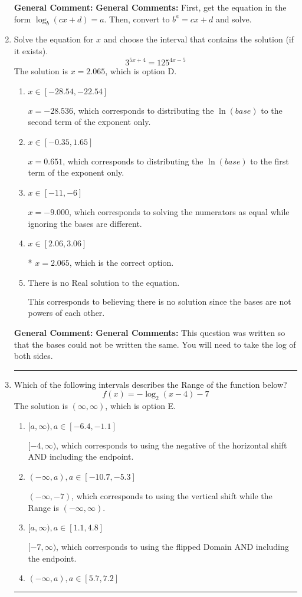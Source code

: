 \documentclass{extbook}[14pt]
\newcommand{\litem}[1]{\item #1

\rule{\textwidth}{0.4pt}}
\begin{document}
\begin{enumerate}
{\textbf{General Comment:} \textbf{General Comments:} First, get the equation in the form $\log_b{(cx+d)} = a$. Then, convert to $b^a = cx+d$ and solve.
}
\litem{
Solve the equation for $x$ and choose the interval that contains the solution (if it exists).
\[ 3^{5x+4} = 125^{4x-5} \]The solution is \( x = 2.065 \), which is option D.\begin{enumerate}[label=\Alph*.]
\item \( x \in [-28.54, -22.54] \)

$x = -28.536$, which corresponds to distributing the $\ln(base)$ to the second term of the exponent only.
\item \( x \in [-0.35, 1.65] \)

$x = 0.651$, which corresponds to distributing the $\ln(base)$ to the first term of the exponent only.
\item \( x \in [-11, -6] \)

$x = -9.000$, which corresponds to solving the numerators as equal while ignoring the bases are different.
\item \( x \in [2.06, 3.06] \)

* $x = 2.065$, which is the correct option.
\item \( \text{There is no Real solution to the equation.} \)

This corresponds to believing there is no solution since the bases are not powers of each other.
\end{enumerate}

\textbf{General Comment:} \textbf{General Comments:} This question was written so that the bases could not be written the same. You will need to take the log of both sides.
}
\litem{
Which of the following intervals describes the Range of the function below?
\[ f(x) = -\log_2{(x-4)}-7 \]The solution is \( (\infty, \infty) \), which is option E.\begin{enumerate}[label=\Alph*.]
\item \( [a, \infty), a \in [-6.4, -1.1] \)

$[-4, \infty)$, which corresponds to using the negative of the horizontal shift AND including the endpoint.
\item \( (-\infty, a), a \in [-10.7, -5.3] \)

$(-\infty, -7)$, which corresponds to using the vertical shift while the Range is $(-\infty, \infty)$.
\item \( [a, \infty), a \in [1.1, 4.8] \)

$[-7, \infty)$, which corresponds to using the flipped Domain AND including the endpoint.
\item \( (-\infty, a), a \in [5.7, 7.2] \)


\end{enumerate}}
\end{enumerate}
\end{document}
